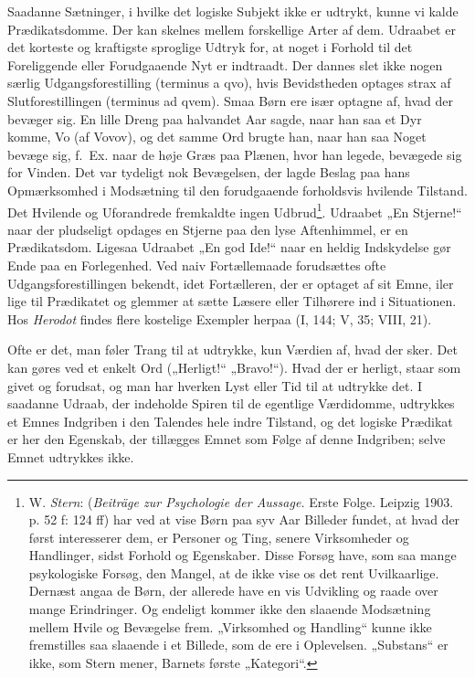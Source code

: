 \documentclass[12pt,a4paper]{book}
\newcommand{\apage}[1]{\marginnote{\footnotesize\textit{[#1]}}}
\begin{document}
Saadanne Sætninger, i hvilke det logiske Subjekt ikke er udtrykt, kunne
vi kalde Prædikatsdomme. Der kan skelnes mellem forskellige Arter af
dem. Udraabet er det korteste og kraftigste sproglige Udtryk for, at
noget i Forhold til det Foreliggende eller Forudgaaende Nyt er
indtraadt. Der dannes slet ikke nogen særlig Udgangsforestilling
(terminus a qvo), hvis Bevidstheden optages strax af Slutforestillingen
(terminus ad qvem). Smaa Børn ere især optagne af, hvad der bevæger sig.
En lille Dreng paa halvandet Aar sagde, naar han saa et Dyr komme, Vo
(af Vovov), og det samme Ord brugte han, naar han saa Noget bevæge sig,
f.\ Ex. naar de høje Græs paa Plænen, hvor han legede, bevægede sig for \apage{85}
Vinden. Det var tydeligt nok Bevægelsen, der lagde Beslag paa hans
Opmærksomhed i Modsætning til den forudgaaende forholdsvis hvilende
Tilstand. Det Hvilende og Uforandrede fremkaldte ingen Udbrud\footnote{W.
\emph{Stern}: (\emph{Beiträge zur Psychologie der Aussage.} Erste Folge. Leipzig 1903. p. 52 f: 124 ff) har ved at vise Børn paa syv Aar Billeder
fundet, at hvad der først interesserer dem, er Personer og Ting, senere
Virksomheder og Handlinger, sidst Forhold og Egenskaber. Disse Forsøg
have, som saa mange psykologiske Forsøg, den Mangel, at de ikke vise os
det rent Uvilkaarlige. Dernæst angaa de Børn, der allerede have en vis
Udvikling og raade over mange Erindringer. Og endeligt kommer ikke den
slaaende Modsætning mellem Hvile og Bevægelse frem. „Virksomhed og
Handling“ kunne ikke fremstilles saa slaaende i et Billede, som de ere i
Oplevelsen. „Substans“ er ikke, som Stern mener, Barnets første
„Kategori“.}. Udraabet „En Stjerne!“ naar der pludseligt opdages en
Stjerne paa den lyse Aftenhimmel, er en Prædikatsdom. Ligesaa Udraabet
„En god Ide!“ naar en heldig Indskydelse gør Ende paa en Forlegenhed.
Ved naiv Fortællemaade forudsættes ofte Udgangsforestillingen bekendt,
idet Fortælleren, der er optaget af sit Emne, iler lige til Prædikatet
og glemmer at sætte Læsere eller Tilhørere ind i Situationen. Hos
\emph{Herodot} findes flere kostelige Exempler herpaa (I, 144; V, 35;
VIII, 21).

Ofte er det, man føler Trang til at udtrykke, kun Værdien af, hvad der
sker. Det kan gøres ved et enkelt Ord („Herligt!“ „Bravo!“). Hvad der er
herligt, staar som givet og forudsat, og man har hverken Lyst eller Tid
til at udtrykke det. I saadanne Udraab, der indeholde Spiren til de
egentlige Værdidomme, udtrykkes et Emnes Indgriben i den Talendes hele
indre Tilstand, og det logiske Prædikat er her den Egenskab, der
tillægges Emnet som Følge af denne Indgriben; selve Emnet udtrykkes
ikke.
\end{document}
